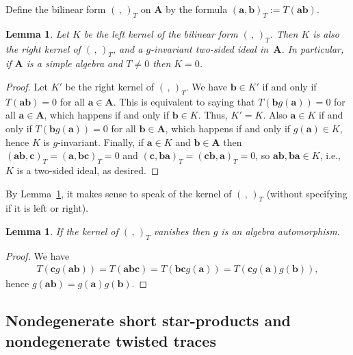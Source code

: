 \documentclass[11pt]{article}
\numberwithin{equation}{section}
\numberwithin{equation}{section}
\newtheorem{Lemma}[Theorem]{Lemma}
\begin{document}
Define the bilinear form $(\,,\,)_T$ on ${\mathbf A}$ by the formula $({\mathbf a},{\mathbf b})_T:=T({\mathbf a}{\mathbf b})$.

\begin{Lemma}\label{ide} Let $K$ be the left kernel of the bilinear form $(\,,\,)_T$. Then $K$ is also the right kernel of $(\,,\,)_T$, and a $g$-invariant two-sided ideal in~${{\mathbf A}}$. In particular, if ${\mathbf A}$ is a simple algebra and $T\ne 0$ then $K=0$.
\end{Lemma}

\begin{proof} Let $K'$ be the right kernel of $(\,,\,)_T$. We have ${\mathbf b}\in K'$ if and only if $T({\textbf{ab}})=0$ for all ${\mathbf a}\in {{\mathbf A}}$. This is equivalent to saying that $T({\mathbf b}g({\mathbf a}))=0$ for all ${\mathbf a}\in {{\mathbf A}}$, which happens if and only if ${\mathbf b}\in K$. Thus, $K'=K$. Also ${\mathbf a}\in K$ if and only if $T({\mathbf b}g({\mathbf a}))=0$ for all ${\mathbf b}\in {\mathbf A}$, which happens if and only if $g({\mathbf a})\in K$, hence $K$ is $g$-invariant. Finally, if ${\mathbf a}\in K$ and ${\mathbf b}\in {{\mathbf A}}$
then $({\textbf{ab}},{\textbf{c}})_T= ({\textbf{a}},{\textbf{bc}})_T=0$ and $({\textbf{c}},{\textbf{ba}})_T=({\textbf{cb}},{\textbf{a}})_T=0$, so ${\textbf{ab}},{\textbf{ba}}\in K$, i.e., $K$ is a two-sided ideal, as desired.
\end{proof}

By Lemma~\ref{ide}, it makes sense to speak of the kernel of $(\,,\,)_T$ (without specifying if it is left or right).

\begin{Lemma} If the kernel of $(\,,\,)_T$ vanishes then $g$ is an algebra automorphism.
\end{Lemma}

\begin{proof}We have
\begin{gather*}
T({\mathbf c}g({\mathbf a}{\mathbf b}))=T({\textbf{abc}})=T({\textbf{bc}}g({\mathbf a}))=T({\mathbf c}g({\mathbf a})g({\mathbf b})),
\end{gather*}
hence $g({\mathbf{ab}})=g({\mathbf a})g({\mathbf b})$.
\end{proof}

\subsection{Nondegenerate short star-products and nondegenerate twisted traces}
\end{document}
